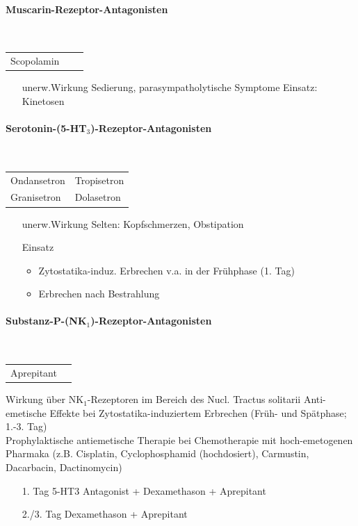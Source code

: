 \documentclass[10pt,a4paper]{report}
\begin{document}
\paragraph{Muscarin-Rezeptor-Antagonisten} %
\label{par:muscarin_rezeptor_antagonisten}
\mbox{}\\
\begin{tabularx}{\textwidth}{XXX}
Scopolamin\\
\end{tabularx}
\begin{itemize}
	\item[unerw.Wirkung] Sedierung, parasympatholytische Symptome
	Einsatz: Kinetosen
\end{itemize}
\paragraph{Serotonin-(5-HT$_3$)-Rezeptor-Antagonisten} %
\label{par:serotonin_5_ht__3_rezeptor_antagonisten}
\mbox{}\\
\begin{tabularx}{\textwidth}{XX}
Ondansetron&Tropisetron\\
Granisetron&Dolasetron\\
\end{tabularx}
\begin{itemize}
	\item[unerw.Wirkung] Selten: Kopfschmerzen, Obstipation
	\item[Einsatz]
	\begin{itemize}
	 	\item Zytostatika-induz. Erbrechen v.a. in der Frühphase (1. Tag)
		\item Erbrechen nach Bestrahlung 
	 \end{itemize} 
\end{itemize}
\paragraph{Substanz-P-(NK$_1$)-Rezeptor-Antagonisten } %
\label{par:substanz_p_nk__1_rezeptor_antagonisten_}
\mbox{}\\
\begin{tabularx}{\textwidth}{XX}
Aprepitant\\
\end{tabularx}
Wirkung über NK$_1$-Rezeptoren im Bereich des Nucl. Tractus solitarii
Anti-emetische Effekte bei Zytostatika-induziertem Erbrechen 
(Früh- und Spätphase; 1.-3. Tag)\\
Prophylaktische  antiemetische Therapie bei Chemotherapie mit hoch-emetogenen Pharmaka (z.B. Cisplatin, Cyclophosphamid (hochdosiert), Carmustin, Dacarbacin, Dactinomycin)\\
\begin{itemize}
	\item[1. Tag] 5-HT3 Antagonist + Dexamethason + Aprepitant
	\item[2./3. Tag] Dexamethason + Aprepitant
\end{itemize}
\end{document}
